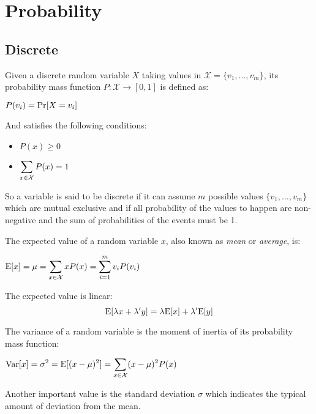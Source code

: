 \chapter{Probability}
\section{Discrete}
\begin{definition}
Given a discrete random variable $X$ taking values in $\mathcal{X}=\{v_1,\hdots, v_m\}$, its probability mass function $P:\mathcal{X}\rightarrow[0,1]$ is defined as:
\begin{center}
	$\displaystyle P(v_i)=\text{Pr}[X=v_i]$
\end{center}
And satisfies the following conditions:
\begin{itemize}
	\item $P(x)\geq 0$
	\item $\displaystyle\sum_{x\in\mathcal{X}}P(x)=1$
\end{itemize}
\end{definition}
So a variable is said to be discrete if it can assume $m$ possible values $\{v_1, \hdots, v_m\}$ which are mutual exclusive and if all probability of the values to happen are non-negative and the sum of probabilities of the events must be 1. \newline
\begin{definition}
The expected value of a random variable $x$, also known as \textit{mean} or \textit{average}, is:
\begin{center}
	$\displaystyle \text{E}[x]=\mu=\displaystyle\sum_{x\in\mathcal{X}}xP(x)=\displaystyle\sum_{i=1}^mv_iP(v_i)$
\end{center}
\end{definition}
The expected value is linear: 
\begin{equation}
	\text{E}[\lambda x+\lambda'y]=\lambda \text{E}[x]+\lambda' \text{E}[y]
	\label{eq:expectedValueLinear}
\end{equation}
\begin{definition}[Variance]
The variance of a random variable is the moment of inertia of its probability mass function:
\begin{center}
	$\displaystyle \text{Var}[x]=\sigma^2=\text{E}[(x-\mu)^2]=\displaystyle\sum_{x\in\mathcal{X}}(x-\mu)^2P(x)$
\end{center}
\end{definition}
Another important value is the standard deviation $\sigma$ which indicates the typical amount of deviation from the mean.\newline
